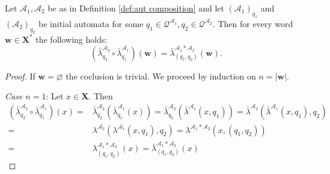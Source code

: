 \documentclass[mat1]{fmfdeloTS2.0}
\newcommand{\word}{\mathbf}				%
\newcommand{\abece}{\mathbf{X}}			%
\newcommand{\fslovar}{\mathbf{X^*}}		%
\newcommand{\auto}{\mathcal}			%
\newcommand{\QQ}{\mathcal{Q}}			%
\newcommand{\LAMBDA}{\bar{\lambda}}			%
\begin{document}
\begin{proposition}\label{obs:first obs on compostion}
Let $\auto{A}_1,\auto{A}_2$ be as in Definition \ref{def:aut composition} and let $(\auto{A}_1)_{q_1}$ and $(\auto{A}_2)_{q_2}$ be initial automata for some $q_1\in\QQ^{\auto{A}_1},q_2\in\QQ^{\auto{A}_2}$. Then for every word $\word{w}\in\fslovar$ the following holds: 
$$ (\LAMBDA^{\auto{A}_2}_{q_2} \circ \LAMBDA^{\auto{A}_1}_{q_1})(\word{w}) = \LAMBDA^{\auto{A}_1*\auto{A}_2}_{(q_1,q_2)}(\word{w}).$$
\end{proposition}
\begin{proof}
If $\word{w}=\varnothing$ the coclusion is trivial. We proceed by induction on $n=|\word{w}|$.

\emph{Case $n=1$}: Let $x\in\abece$. Then
\begin{align*}
(\LAMBDA_{q_2}^{\auto{A}_2}\circ\LAMBDA_{q_1}^{\auto{A}_1})(x)=&
\LAMBDA_{q_2}^{\auto{A}_2}(\LAMBDA_{q_1}^{\auto{A}_1}(x))=
\LAMBDA_{q_2}^{\auto{A}_2}(\LAMBDA^{\auto{A}_1}(x,q_1))=
\LAMBDA^{\auto{A}_2}(\LAMBDA^{\auto{A}_1}(x,q_1),q_2)\\=&
\lambda^{\auto{A}_2}(\lambda^{\auto{A}_1}(x,q_1),q_2)=
\lambda^{\auto{A}_1*\auto{A}_2}(x,(q_1,q_2))\\=&
\lambda^{\auto{A}_1*\auto{A}_2}_{(q_1,q_2)}(x)=
\LAMBDA^{\auto{A}_1*\auto{A}_2}_{(q_1,q_2)}(x)
\end{align*}


\end{proof}
\end{document}
